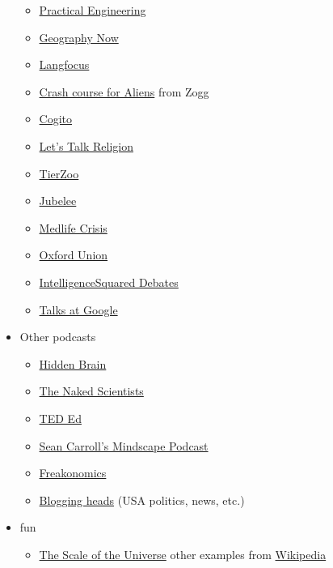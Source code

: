 \documentclass{article}
\begin{document}
\begin{itemize}
\begin{itemize}
    \item \href{https://www.youtube.com/user/gradyhillhouse}{Practical Engineering}
    \item \href{https://www.youtube.com/user/GeographyNow}{Geography Now}
    \item \href{https://www.youtube.com/channel/UCNhX3WQEkraW3VHPyup8jkQ}{Langfocus}
    \item \href{https://www.youtube.com/channel/UCKY00CSQo1MoC27bdGd-w_g}{Crash course for Aliens} from Zogg
    \item \href{https://www.youtube.com/channel/UCKMnl27hDMKvch--noWe5CA}{Cogito}
    \item \href{https://www.youtube.com/channel/UC9dRb4fbJQIbQ3KHJZF_z0g}{Let's Talk Religion}
    \item \href{https://www.youtube.com/channel/UCHsRtomD4twRf5WVHHk-cMw}{TierZoo}
    \item \href{https://www.youtube.com/channel/UCJjSDX-jUChzOEyok9XYRJQ}{Jubelee}
    \item \href{https://www.youtube.com/channel/UCgRBRE1DUP2w7HTH9j_L4OQ}{Medlife Crisis}
    \item \href{https://www.youtube.com/channel/UCY7dD6waquGnKTZSumPMTlQ}{Oxford Union}
    \item \href{https://www.youtube.com/channel/UCenxjWEkb0Sv67vejOgZ3Tg}{IntelligenceSquared Debates}
    \item \href{https://www.youtube.com/c/talksatgoogle}{Talks at Google}
    \end{itemize}
    
    \item Other podcasts
    \begin{itemize}
    \item \href{https://www.npr.org/podcasts/510308/hidden-brain}{Hidden Brain}
    \item \href{https://www.thenakedscientists.com/}{The Naked Scientists}
    \item \href{https://ed.ted.com/}{TED Ed}
    \item \href{https://www.preposterousuniverse.com/podcast/}{Sean Carroll's Mindscape Podcast}
    \item \href{https://freakonomics.com/}{Freakonomics}
    \item \href{https://bloggingheads.tv/}{Blogging heads} (USA politics, news, etc.)
    \end{itemize}
    
    \item fun
    \begin{itemize}
        \item \href{http://htwins.net/scale2/}{The Scale of the Universe} other examples from \href{https://en.wikipedia.org/wiki/Orders_of_magnitude_(length)}{Wikipedia}
    \end{itemize}
    

\end{itemize}
\end{document}
